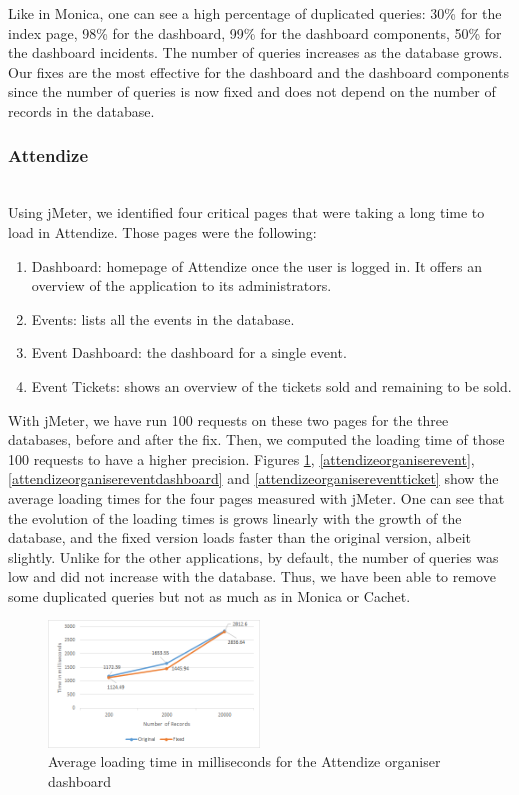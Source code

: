 \documentclass[sigconf]{acmart}
\begin{document}
Like in Monica, one can see a high percentage of duplicated queries: 30\% for the index page, 98\% for the dashboard, 99\% for the dashboard components, 50\% for the dashboard incidents. The number of queries increases  as the database grows. Our fixes are the most effective for the dashboard and the dashboard components since the number of queries is now fixed and does not depend on the number of records in the database.
\\
\subsubsection{Attendize}~\\
Using jMeter, we identified four critical pages that were taking a long time to load in Attendize. Those pages were the following:
\begin{enumerate}
\item Dashboard: homepage of Attendize once the user is logged in. It offers an overview of the application to its administrators.
\item Events: lists all the events in the database. 
\item Event Dashboard: the dashboard for a single event. 
\item Event Tickets: shows an overview of the tickets sold and remaining to be sold. 
\end{enumerate}
With jMeter, we have run 100 requests on these two pages for the three databases, before and after the fix. Then, we computed the loading time of those 100 requests to have a higher precision. Figures \ref{attendizeorganiserdashboard}, \ref{attendizeorganiserevent}, \ref{attendizeorganisereventdashboard} and \ref{attendizeorganisereventticket} show the average loading times for the four pages measured with jMeter. One can see that the evolution of the loading times is grows linearly with the growth of the database, and the fixed version loads faster than the original version, albeit slightly. Unlike for the other applications, by default, the number of queries was low and did not increase with the database. Thus, we have been able to remove some duplicated queries but not as much as in Monica or Cachet.
\begin{figure}[b!]
\includegraphics[width=0.5\textwidth]{attendizeorganiserdashboard}
\caption{Average loading time in milliseconds for the Attendize organiser dashboard}
\label{attendizeorganiserdashboard}
\end{figure}
\end{document}
